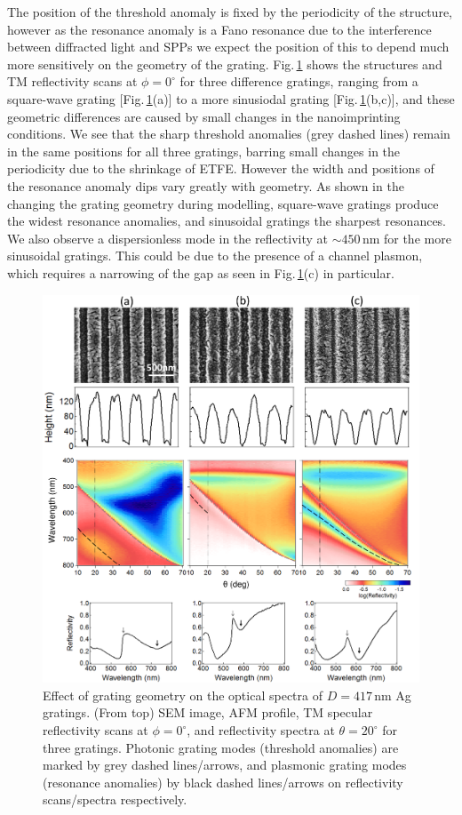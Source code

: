 The position of the threshold anomaly is fixed by the periodicity of the structure, however as the resonance anomaly is a Fano resonance due to the interference between diffracted light and SPPs we expect the position of this to depend much more sensitively on the geometry of the grating. Fig.\,\ref{7Fig10} shows the structures and TM reflectivity scans at $\phi=0^{\circ}$ for three difference gratings, ranging from a square-wave grating [Fig.\,\ref{7Fig10}(a)] to a more sinusiodal grating [Fig.\,\ref{7Fig10}(b,c)], and these geometric differences are caused by small changes in the nanoimprinting conditions. We see that the sharp threshold anomalies (grey dashed lines) remain in the same positions for all three gratings, barring small changes in the periodicity due to the shrinkage of ETFE. However the width and positions of the resonance anomaly dips vary greatly with geometry. As shown in the changing the grating geometry during modelling, square-wave gratings produce the widest resonance anomalies, and sinusoidal gratings the sharpest resonances. We also observe a dispersionless mode in the reflectivity at $\sim450$\,nm for the more sinusoidal gratings. This could be due to the presence of a channel plasmon, which requires a narrowing of the gap as seen in Fig.\,\ref{7Fig10}(c) in particular.
\begin{figure}[ht] 
\centering    
\includegraphics[width=\textwidth]{Fig10}
\caption{Effect of grating geometry on the optical spectra of $D=417$\,nm Ag gratings. (From top) SEM image, AFM profile, TM specular reflectivity scans at $\phi=0^{\circ}$, and reflectivity spectra at $\theta=20^{\circ}$ for three gratings. Photonic grating modes (threshold anomalies) are marked by grey dashed lines/arrows, and plasmonic grating modes (resonance anomalies) by black dashed lines/arrows on reflectivity scans/spectra respectively.}
\label{7Fig10}
\end{figure}

